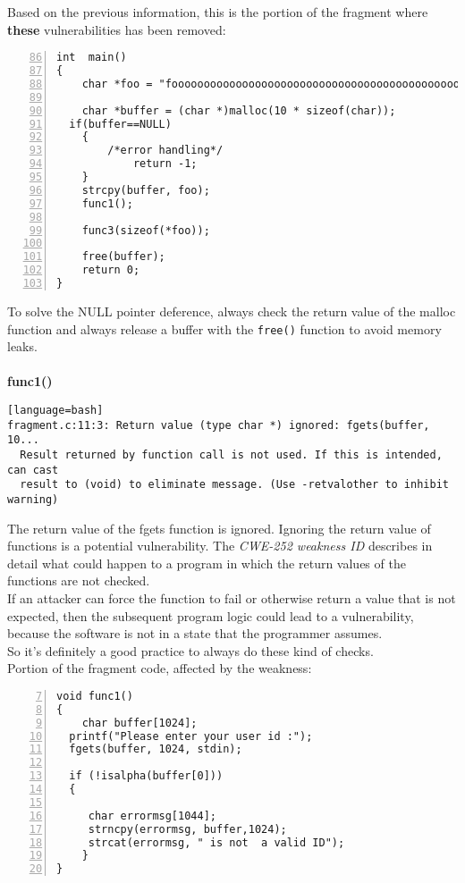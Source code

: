 \documentclass[a4paper,12pt]{article}
\begin{document}
\newpage
\noindent
Based on the previous information, this is the portion of the fragment where \textbf{these} vulnerabilities has been removed:
\begin{lstlisting}[style=c,numbers=left,firstnumber=86,linebackgroundcolor={
\ifnum\value{lstnumber}=91\color{green}\fi
\ifnum\value{lstnumber}=101\color{green}\fi}]
int  main()
{
	char *foo = "fooooooooooooooooooooooooooooooooooooooooooooooooooo";
	
	char *buffer = (char *)malloc(10 * sizeof(char));
  if(buffer==NULL)
	{
	    /*error handling*/
     	    return -1;
	}
	strcpy(buffer, foo);
	func1();
   
	func3(sizeof(*foo));
	
	free(buffer);
	return 0;
}

\end{lstlisting}
To solve the NULL pointer deference, always check the return value of the malloc function and always release a buffer with the \texttt{free()} function to avoid memory leaks.\\\\


\noindent
\textbf{func1()}\\

\begin{lstlisting}[style=DOS][language=bash]
fragment.c:11:3: Return value (type char *) ignored: fgets(buffer, 10...
  Result returned by function call is not used. If this is intended, can cast
  result to (void) to eliminate message. (Use -retvalother to inhibit warning)
\end{lstlisting}
The return value of the fgets function is ignored.
Ignoring the return value of functions is a potential vulnerability.
The \textit{CWE-252 weakness ID} \cite{CWE252} 
describes in detail what could happen to a program in which the return values of the functions are not checked.\\
If an attacker can force the function to fail or otherwise return a value that is not expected, then the subsequent program logic could lead to a vulnerability, because the software is not in a state that the programmer assumes.\\
So it's definitely a good practice to always do these kind of checks.\\
Portion of the fragment code, affected by the weakness:
\begin{lstlisting}[style=c,numbers=left,firstnumber=7,linebackgroundcolor={
\ifnum\value{lstnumber}=11\color{red}\fi
}]
void func1()
{	
	char buffer[1024];
  printf("Please enter your user id :");
  fgets(buffer, 1024, stdin);
 
  if (!isalpha(buffer[0]))
  {

     char errormsg[1044];
     strncpy(errormsg, buffer,1024);
     strcat(errormsg, " is not  a valid ID");
 	}
}
\end{lstlisting}
\end{document}
